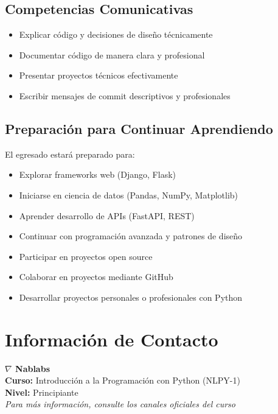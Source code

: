 \documentclass[12pt,letterpaper]{article}
\begin{document}
\subsection{Competencias Comunicativas}
\begin{itemize}[leftmargin=*]
    \item Explicar código y decisiones de diseño técnicamente
    \item Documentar código de manera clara y profesional
    \item Presentar proyectos técnicos efectivamente
    \item Escribir mensajes de commit descriptivos y profesionales
\end{itemize}

\subsection{Preparación para Continuar Aprendiendo}

El egresado estará preparado para:
\begin{itemize}[leftmargin=*]
    \item Explorar frameworks web (Django, Flask)
    \item Iniciarse en ciencia de datos (Pandas, NumPy, Matplotlib)
    \item Aprender desarrollo de APIs (FastAPI, REST)
    \item Continuar con programación avanzada y patrones de diseño
    \item Participar en proyectos open source
    \item Colaborar en proyectos mediante GitHub
    \item Desarrollar proyectos personales o profesionales con Python
\end{itemize}

\newpage

\section{Información de Contacto}

\begin{center}
\large
\textbf{$\nabla$ Nablabs}\\
\vspace{0.5cm}
\textbf{Curso:} Introducción a la Programación con Python (NLPY-1)\\
\textbf{Nivel:} Principiante\\
\vspace{1cm}
\textit{Para más información, consulte los canales oficiales del curso}
\end{center}
\end{document}
